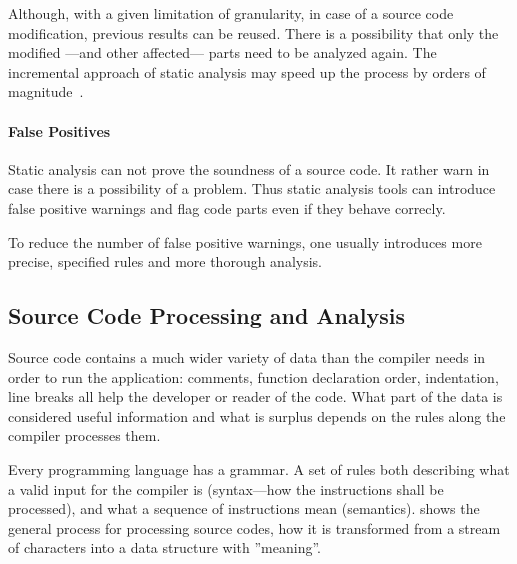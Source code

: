 Although, with a given limitation of granularity, in case of a source code modification, previous results can be reused. There is a possibility that only the modified ---and other affected--- parts need to be analyzed again. The incremental approach of static analysis may speed up the process by orders of magnitude~\cite{stein-daniel-bsc}.

\paragraph{False Positives} Static analysis can not prove the soundness of a source code. It rather warn in case there is a possibility of a problem. Thus static analysis tools can introduce false positive warnings and flag code parts even if they behave correcly.

To reduce the number of false positive warnings, one usually introduces more precise, specified rules and more thorough analysis.

%
%

\subsection{Source Code Processing and Analysis}
Source code contains a much wider variety of data than the compiler needs in order to run the application: comments, function declaration order, indentation, line breaks all help the developer or reader of the code. What part of the data is considered useful information and what is surplus depends on the rules along the compiler processes them.

Every programming language has a grammar. A set of rules both describing what a valid input for the compiler is (syntax---how the instructions shall be processed), and what a sequence of instructions mean (semantics).  shows the general process for processing source codes, how it is transformed from a stream of characters into a data structure with ''meaning''.

